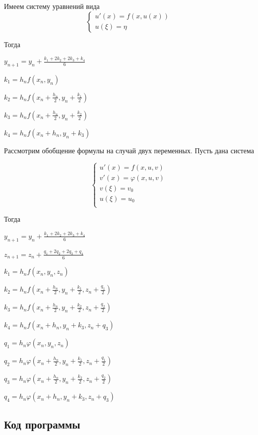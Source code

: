 \documentclass[a4paper,14pt]{article}
\begin{document}
Имеем систему уравнений вида
\begin{equation*}
 \begin{cases}
   u'(x) = f(x, u(x)) \\
   u(\xi) = \eta
 \end{cases}
\end{equation*}

Тогда

$y_{n+1} = y_n + \frac{k_1 + 2k_2 + 2k_3 + k_4}{6}$

$k_1 = h_n f(x_n, y_n)$

$k_2 = h_n f(x_n + \frac{h_n}{2}, y_n + \frac{k_1}{2})$

$k_3 = h_n f(x_n + \frac{h_n}{2}, y_n + \frac{k_2}{2})$

$k_4 = h_n f(x_n + h_n, y_n + k_3)$

Рассмотрим обобщение формулы на случай двух переменных. Пусть дана система

\begin{equation*}
 \begin{cases}
   u'(x) = f(x, u, v) \\
   v'(x) = \varphi(x, u, v) \\
   v(\xi) = v_0 \\
   u(\xi) = u_0 \\
 \end{cases}
\end{equation*}

Тогда

$y_{n+1} = y_n + \frac{k_1 + 2k_2 + 2k_3 + k_4}{6}$

$z_{n+1} = z_n + \frac{q_1 + 2q_2 + 2q_3 + q_4}{6}$

$k_1 = h_n f(x_n, y_n, z_n)$

$k_2 = h_n f(x_n + \frac{h_n}{2}, y_n + \frac{k_1}{2}, z_n + \frac{q_1}{2})$

$k_3 = h_n f(x_n + \frac{h_n}{2}, y_n + \frac{k_2}{2}, z_n + \frac{q_2}{2})$

$k_4 = h_n f(x_n + h_n, y_n + k_3, z_n + q_3)$

$q_1 = h_n \varphi(x_n, y_n, z_n)$

$q_2 = h_n \varphi(x_n + \frac{h_n}{2}, y_n + \frac{k_1}{2}, z_n + \frac{q_1}{2})$

$q_3 = h_n \varphi(x_n + \frac{h_n}{2}, y_n + \frac{k_2}{2}, z_n + \frac{q_2}{2})$

$q_4 = h_n \varphi(x_n + h_n, y_n + k_3, z_n + q_3)$

\subsection*{Код программы}
\end{document}
